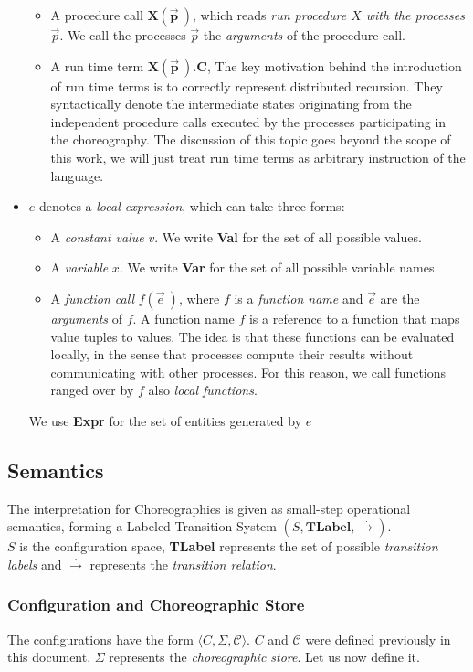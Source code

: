 \documentclass[12pt,a4paper,twoside]{book}
\begin{document}
\begin{itemize}
\begin{itemize}
	\item A procedure call $\bm{X(\vec{p}~)}$, which reads \textit{run procedure $X$ with the processes $\vec{p}$}. We call the processes $\vec{p}$ the \textit{arguments} of the procedure call.
	\item A run time term $\bm{X(\vec{p}~).C}$,
		The key motivation behind the introduction of run time terms is to correctly represent distributed recursion. They syntactically denote the intermediate states originating from the independent procedure calls executed by the processes participating in the choreography. The discussion of this topic goes beyond the scope of this work, we will just treat run time terms as arbitrary instruction of the language.
\end{itemize}
\item $e$ denotes a \textit{local expression}, which can take three forms:
\begin{itemize}
	\item A \emph{constant value} $v$. We write \textbf{Val} for the set of all possible values.
	\item A \emph{variable} $x$. We write \textbf{Var} for the set of all possible variable names.
	\item A \emph{function call} $f(\vec{e}~)$, where $f$ is a \emph{function name} and $\vec{e}$ are the \emph{arguments} of $f$.
A function name $f$ is a reference to a function that maps value tuples to values. The idea is that these functions can be evaluated locally, in the sense that processes compute their results without communicating with other processes. For this reason, we call functions ranged over by $f$ also \emph{local functions}.
\end{itemize} 
We use \textbf{Expr} for the set of entities generated by $e$
\end{itemize}

\subsection{Semantics}
The interpretation for Choreographies is given as small-step operational semantics\cite{plotkin2004origins}, forming a Labeled Transition System $(S,\textbf{TLabel},\xrightarrow{.})$.\\
$S$ is the configuration space, \textbf{TLabel} represents the set of possible \textit{transition labels} and $\xrightarrow{.}$ represents the \textit{transition relation}.
\subsubsection{Configuration and Choreographic Store}
The configurations have the form $\langle C, \Sigma, \mathscr{C} \rangle$.
$C$ and $\mathscr{C}$ were defined previously in this document.
$\Sigma$ represents the \textit{choreographic store}. Let us now define it.
\end{document}
